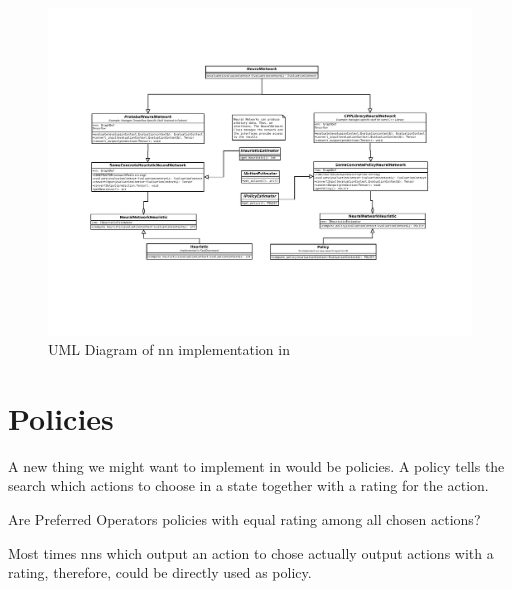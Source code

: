 \documentclass{report}
\begin{document}
\begin{figure}[ht]
\vspace*{-7cm}
\begin{center}
  \centerline{\includegraphics[width=2.5\textwidth,
  angle=270]{images/UML_FD_NN}}
  \caption{UML Diagram of \gls{nn} implementation in \fd{}}
  \label{fig-uml-fd-nn}
\end{center}
\end{figure}



\section{Policies}
A new thing we might want to implement in \fd{} would be policies. A policy
tells the search which actions to choose in a state together with a rating for
the action.

{\color{morange} Are Preferred Operators policies with equal rating among
all chosen actions?}

Most times \glspl{nn} which output an action to chose actually output actions
with a rating, therefore, could be directly used as policy.
\end{document}
